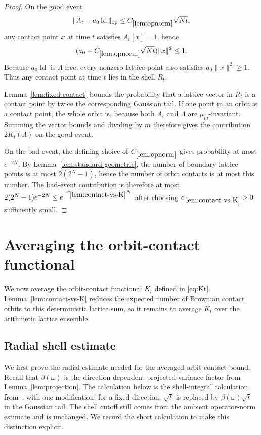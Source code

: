 \documentclass[11pt]{article}
\theoremstyle{remark}
\newcommand{\Id}{\operatorname{Id}}
\newcommand{\op}{\operatorname{op}}
\begin{document}
\begin{proof}
On the good event
\[
        \|A_t-a_0\Id\|_{\op}\le C_{\ref{lem:opnorm}}\sqrt{Nt},
\]
any contact point $x$ at time $t$ satisfies $A_t[x]=1$, hence
\[
        (a_0-C_{\ref{lem:opnorm}}\sqrt{Nt})\|x\|^2\le1.
\]
Because $a_0\Id$ is $\Lambda$-free, every nonzero lattice point also satisfies $a_0\|x\|^2\ge1$.  Thus any contact point at time $t$ lies in the shell $R_t$.

Lemma~\ref{lem:fixed-contact} bounds the probability that a lattice vector in
$R_t$ is a contact point by twice the corresponding Gaussian tail.  If one
point in an orbit is a contact point, the whole orbit is, because both $A_t$
and $\Lambda$ are $\mu_m$-invariant.  Summing the vector bounds and dividing by
$m$ therefore gives the contribution $2K_t(\Lambda)$ on the good event.

On the bad event, the defining choice of $C_{\ref{lem:opnorm}}$ gives
probability at most $e^{-2N}$.  By Lemma~\ref{lem:standard-geometric}, the
number of boundary lattice points is at most $2(2^N-1)$, hence the number of
orbit contacts is at most this number.  The bad-event contribution is therefore
at most $2(2^N-1)e^{-2N}\le e^{-c_{\ref{lem:contact-vs-K}}N}$ after choosing
$c_{\ref{lem:contact-vs-K}}>0$ sufficiently small.
\end{proof}


\section{Averaging the orbit-contact functional}

We now average the orbit-contact functional $K_t$ defined in
\eqref{eq:Kt}.  Lemma~\ref{lem:contact-vs-K} reduces the expected number of
Brownian contact orbits to this deterministic lattice sum, so it remains to
average $K_t$ over the arithmetic lattice ensemble.

\subsection{Radial shell estimate}

We first prove the radial estimate needed for the averaged orbit-contact
bound.  Recall that $\beta(\omega)$ is the direction-dependent
projected-variance factor from Lemma~\ref{lem:projection}.  The calculation
below is the shell-integral calculation from~\cite[Lemma~4.3]{Klartag}, with
one modification: for a fixed direction, $\sqrt t$ is replaced by
$\beta(\omega)\sqrt t$ in the Gaussian tail.  The shell cutoff still comes
from the ambient operator-norm estimate and is unchanged.  We record the
short calculation to make this distinction explicit.
\end{document}
